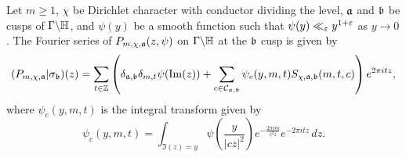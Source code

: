     \begin{proposition}
      Let $m \ge 1$, $\chi$ be Dirichlet character with conductor dividing the level, $\mathfrak{a}$ and $\mathfrak{b}$ be cusps of $\Gamma\backslash\mathbb{H}$, and $\psi(y)$ be a smooth function such that $\psi(y) \ll_{\varepsilon} y^{1+\varepsilon}$ as $y \to 0$. The Fourier series of $P_{m,\chi,\mathfrak{a}}(z,\psi)$ on $\Gamma\backslash\mathbb{H}$ at the $\mathfrak{b}$ cusp is given by
      \[
        (P_{m,\chi,\mathfrak{a}}|\sigma_{\mathfrak{b}})(z) = \sum_{t \in \mathbb{Z}}\left(\delta_{\mathfrak{a},\mathfrak{b}}\delta_{m,t}\psi(\mathrm{Im}(z))+\sum_{\substack{c \in \mathcal{C}_{\mathfrak{a},\mathfrak{b}}}}\psi_{c}(y,m,t)S_{\chi,\mathfrak{a},\mathfrak{b}}(m,t,c)\right)e^{2\pi itz},
      \]
      where $\psi_{c}(y,m,t)$ is the integral transform given by
      \[
        \psi_{c}(y,m,t) = \int_{\Im(z) = y}\psi\left(\frac{y}{|cz|^{2}}\right)e^{-\frac{2\pi im}{c^{2}z}}e^{-2\pi itz}\,dz.
      \]
    \end{proposition}
